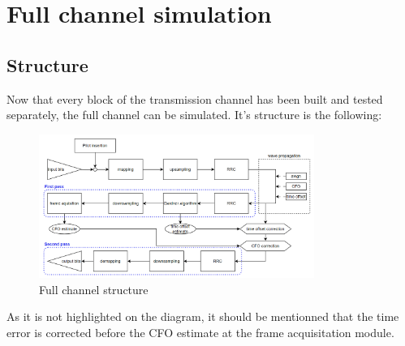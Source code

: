 \documentclass[10pt,a4paper]{ULBreport}
\begin{document}
 









\chapter{Full channel simulation}

\section{Structure}
Now that every block of the transmission channel has been built and tested separately, the full channel can be simulated. It's structure is the following:
\begin{figure}[H]
    \centering
    \includegraphics[width=0.8\textwidth]{pic/Full_channel.png}
    \caption{Full channel structure}
    \label{fig:full_channel}
\end{figure}

As it is not highlighted on the diagram, it should be mentionned that the time error is corrected before the CFO estimate at the frame acquisitation module.
\end{document}
